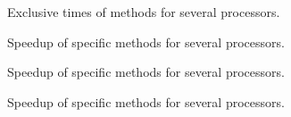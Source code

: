 \documentclass{article}
\begin{document}
	\begin{figure}
		\hspace{-2cm}
		\rule{0cm}{1.1cm}
		\caption{Exclusive times of methods for several processors.}
	\end{figure}
	\begin{figure}
		\hspace{-2cm}
		\rule{0cm}{1.1cm}
		\caption{Speedup of specific methods for several processors.}
	\end{figure}
		\begin{figure}
			\hspace{-2cm}
			\rule{0cm}{1.1cm}
			\caption{Speedup of specific methods for several processors.}
		\end{figure}
				\begin{figure}
					\hspace{-2cm}
					\rule{0cm}{1.1cm}
					\caption{Speedup of specific methods for several processors.}
				\end{figure}
\end{document}
